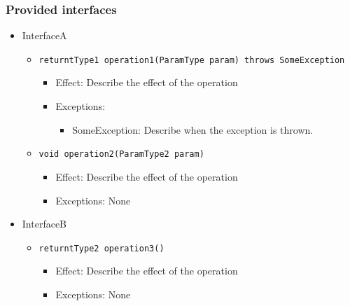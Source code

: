 \documentclass[a4paper,10pt]{article}
\begin{document}
\subsubsection*{Provided interfaces}
\begin{itemize}
    \item InterfaceA
    \begin{itemize}
        \item \texttt{returntType1 operation1(ParamType param) throws SomeException}
        \begin{itemize}
            \item Effect: Describe the effect of the operation
            \item Exceptions:
            \begin{itemize}
                \item SomeException: Describe when the exception is thrown.
            \end{itemize}
		\end{itemize}
        \item \texttt{void operation2(ParamType2 param)}
        \begin{itemize}
            \item Effect: Describe the effect of the operation
            \item Exceptions: None
        \end{itemize}
    \end{itemize}

    \item InterfaceB
    \begin{itemize}
        \item \texttt{returntType2 operation3()}
        \begin{itemize}
            \item Effect: Describe the effect of the operation
            \item Exceptions: None
        \end{itemize}
    \end{itemize}
\end{itemize}
\end{document}
